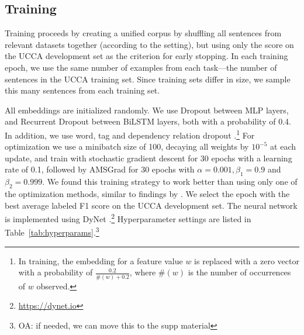 \documentclass[11pt,a4paper]{article}
\newcommand{\oa}[1]{\footnote{\color{red}OA: #1}}
\DeclareMathOperator*{\argmax}{argmax}
\begin{document}
\subsection{Training}

Training proceeds by creating a unified corpus by shuffling all sentences from relevant
datasets together (according to the setting),
but using only the score on the UCCA development set as the criterion for early stopping.
In each training epoch, we use the same number of examples from each task---the
number of sentences in the UCCA training set.
Since training sets differ in size, we sample this many sentences from each training set.

All embeddings are initialized randomly.
We use Dropout \cite{srivastava2014dropout} between MLP layers, and Recurrent Dropout
\cite{NIPS2016_6241} between BiLSTM layers, both with a probability of 0.4.
In addition, we use word, tag and dependency relation dropout \cite{kiperwasser2016simple}.\footnote{In
training, the embedding for a feature value $w$ is replaced with a zero vector
with a probability of $\frac{0.2}{\#(w)+0.2}$, where $\#(w)$ is the number of occurrences of
$w$ observed.}
For optimization we use a minibatch size of 100, decaying all weights by $10^{-5}$ at each update,
and train with stochastic gradient descent for 30 epochs with a learning
rate of 0.1, followed by AMSGrad \cite{j.2018on} for 30 epochs with
$\alpha=0.001,\beta_1=0.9$ and $\beta_2=0.999$.
We found this training strategy to work better than using only one of the optimization methods,
similar to findings by \citet{keskar2017improving}.
We select the epoch with the best average labeled F1 score on the UCCA development set.
The neural network is implemented using DyNet \cite{neubig2017dynet}.\footnote{\url{https://dynet.io}}
Hyperparameter settings are listed in Table~\ref{tab:hyperparams}.\oa{if needed, we can move this to the supp material}

%
%
\end{document}

